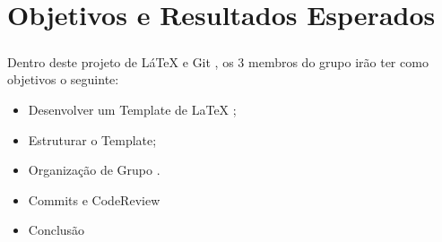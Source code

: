 \chapter*{\thechapter \quad Objetivos e Resultados Esperados}
\paragraph{}

Dentro deste projeto de LáTeX e Git , os 3 membros do grupo irão ter como objetivos o seguinte:
\begin{itemize}
   \item Desenvolver um Template de LaTeX ;
   \item Estruturar o Template;
   \item Organização de Grupo .
   \item Commits e CodeReview
   \item Conclusão
\end{itemize}


